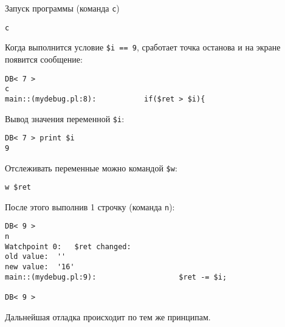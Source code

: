 Запуск программы (команда \verb|c|)
\begin{verbatim}
c
\end{verbatim}
Когда выполнится условие \verb|$i == 9|, сработает точка останова и на экране появится сообщение:
\begin{verbatim}
DB< 7 >
c
main::(mydebug.pl:8):           if($ret > $i){
\end{verbatim}
Вывод значения переменной \verb|$i|:
\begin{verbatim}
DB< 7 > print $i
9
\end{verbatim}
Отслеживать переменные можно командой \verb|$w|:
\begin{verbatim}
w $ret
\end{verbatim}
После этого выполнив 1 строчку (команда \verb|n|):
\begin{verbatim}
DB< 9 >
n
Watchpoint 0:   $ret changed:
old value:  ''
new value:  '16'
main::(mydebug.pl:9):                   $ret -= $i;

DB< 9 >
\end{verbatim}
Дальнейшая отладка происходит по тем же принципам.
